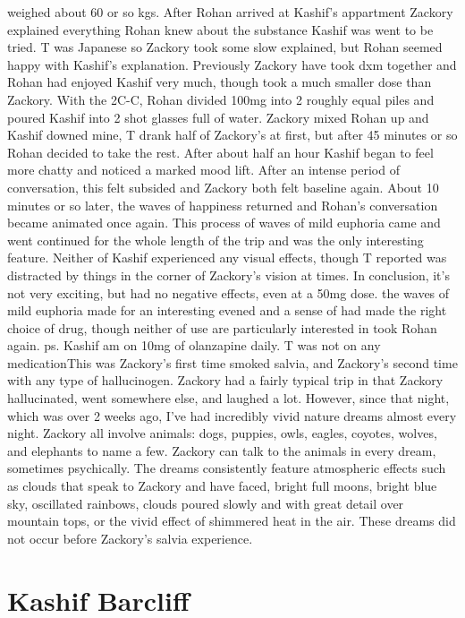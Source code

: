 \documentclass[12pt]{book}
\begin{document}
weighed about 60 or so kgs. After Rohan arrived at Kashif's appartment Zackory explained everything Rohan knew about the substance Kashif was went to be tried. T was Japanese so Zackory took some slow explained, but Rohan seemed happy with Kashif's explanation. Previously Zackory have took dxm together and Rohan had enjoyed Kashif very much, though took a much smaller dose than Zackory. With the 2C-C, Rohan divided 100mg into 2 roughly equal piles and poured Kashif into 2 shot glasses full of water. Zackory mixed Rohan up and Kashif downed mine, T drank half of Zackory's at first, but after 45 minutes or so Rohan decided to take the rest. After about half an hour Kashif began to feel more chatty and noticed a marked mood lift. After an intense period of conversation, this felt subsided and Zackory both felt baseline again. About 10 minutes or so later, the waves of happiness returned and Rohan's conversation became animated once again. This process of waves of mild euphoria came and went continued for the whole length of the trip and was the only interesting feature. Neither of Kashif experienced any visual effects, though T reported was distracted by things in the corner of Zackory's vision at times. In conclusion, it's not very exciting, but had no negative effects, even at a 50mg dose. the waves of mild euphoria made for an interesting evened and a sense of had made the right choice of drug, though neither of use are particularly interested in took Rohan again. ps. Kashif am on 10mg of olanzapine daily. T was not on any medicationThis was Zackory's first time smoked salvia, and Zackory's second time with any type of hallucinogen. Zackory had a fairly typical trip in that Zackory hallucinated, went somewhere else, and laughed a lot. However, since that night, which was over 2 weeks ago, I've had incredibly vivid nature dreams almost every night. Zackory all involve animals: dogs, puppies, owls, eagles, coyotes, wolves, and elephants to name a few. Zackory can talk to the animals in every dream, sometimes psychically. The dreams consistently feature atmospheric effects such as clouds that speak to Zackory and have faced, bright full moons, bright blue sky, oscillated rainbows, clouds poured slowly and with great detail over mountain tops, or the vivid effect of shimmered heat in the air. These dreams did not occur before Zackory's salvia experience.



\chapter{Kashif Barcliff}
\end{document}
